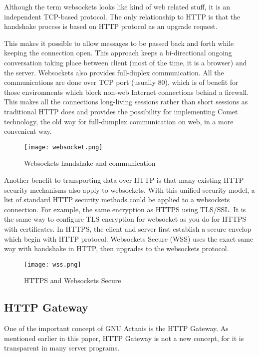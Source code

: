 \documentclass[numbers,numberedpars]{sigplanconf}
\begin{document}
Although the term websockets looks like kind of web related stuff, it is an independent TCP-based protocol. The only relationship to HTTP is that the handshake process is based on HTTP protocol as an upgrade request.

This makes it possible to allow messages to be passed back and forth while keeping the connection open. This approach keeps a bi-directional ongoing conversation taking place between client (most of the time, it is a browser) and the server. Websockets also provides full-duplex communication. All the communications are done over TCP port (usually 80), which is of benefit for those environments which block non-web Internet
connections behind a firewall. This makes all the connections long-living sessions rather than short sessions as traditional HTTP does and provides the possibility for implementing Comet technology, the old way for full-dumplex communication on web, in a more convenient way.

\begin{figure}[tbph]
  \centering
  \label{fig:websocket_connection}
  \texttt{[image: websocket.png]}
  \caption{Websockets handshake and communication}
\end{figure}

Another benefit to transporting data over HTTP is that many existing HTTP security mechanisms also apply to websockets. With this unified security model, a list of standard HTTP security methods could be applied to a websockets connection. For example, the same encryption as HTTPS using TLS/SSL. It is the same way to configure TLS encryption for websocket as you do for HTTPS with certificates. In HTTPS, the client and server first establish a secure envelop which begin with HTTP protocol. Websockets Secure (WSS) uses
the exact same way with handshake in HTTP, then upgrades to the websockets protocol. 

\begin{figure}[tbph]
  \centering
  \label{fig:wss}
  \texttt{[image: wss.png]}
  \caption{HTTPS and Websockets Secure}
\end{figure}

\subsection{HTTP Gateway} \label{HTTP Gateway}

One of the important concept of GNU Artanis is the HTTP Gateway. As mentioned earlier in this paper, HTTP Gateway is not a new concept, for it is transparent in many server programs.
\end{document}
